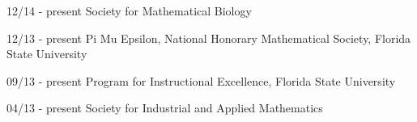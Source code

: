 \documentclass[a4paper]{article}
\begin{document}
\begin{CV}
\item[12/14 - present] Society for Mathematical Biology
\item[12/13 - present] Pi Mu Epsilon, National Honorary Mathematical Society, Florida State University
\item[09/13 - present] Program for Instructional Excellence, Florida State University
\item[04/13 - present] Society for Industrial and Applied Mathematics
\end{CV}

% 
% 
% 
\end{document}
